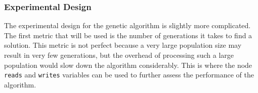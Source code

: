 \documentclass{article}
\begin{document}
\begin{multicols}{2}
\subsubsection{Experimental Design}
The experimental design for the genetic algorithm is slightly more complicated. The first metric that will be used is the number of generations it takes to find a solution. This metric is not perfect because a very large population size may result in very few generations, but the overhead of processing such a large population would slow down the algorithm considerably. This is where the node \texttt{reads} and \texttt{writes} variables can be used to further assess the performance of the algorithm.
\end{multicols}

	
	
\end{document}
